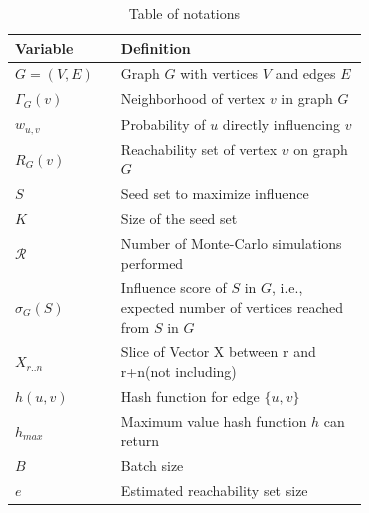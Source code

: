 \documentclass[10pt,journal,compsoc]{IEEEtran}
\begin{document}
\begin{table}[!ht]
    \caption{Table of notations}
    \label{tab:notation}
    \centering
    \begin{tabular}{|l|p{0.7\linewidth}|}
        \hline
        Variable & Definition  \\
        \hline
        $G = (V,E)$     & Graph $G$ with vertices $V$ and edges $E$ \\
        $\Gamma_G(v)$   & Neighborhood of vertex $v$ in graph $G$\\
        $w_{u,v}$       & Probability of $u$ directly influencing $v$ \\
        $R_{G}(v)$      & Reachability set of vertex $v$ on graph $G$\\
        \hline\hline
        $S$             & Seed set to maximize influence\\
        $K$             & Size of the seed set\\
        $\mathcal{R}$   & Number of Monte-Carlo simulations performed\\
        $\sigma_{G}(S)$ & Influence score of $S$ in $G$, i.e., expected number of vertices reached from $S$ in $G$\\
\hline\hline
        $X_{r..n}$      & Slice of Vector X between r and r+n(not including)\\
        $h(u,v)$        & Hash function for edge $\{u,v\}$\\
        $h_{max}$       & Maximum value hash function $h$ can return\\
        \hline\hline
        $B$             & Batch size\\
        $e$             & Estimated reachability set size\\

\end{tabular}
\end{table}
\end{document}
